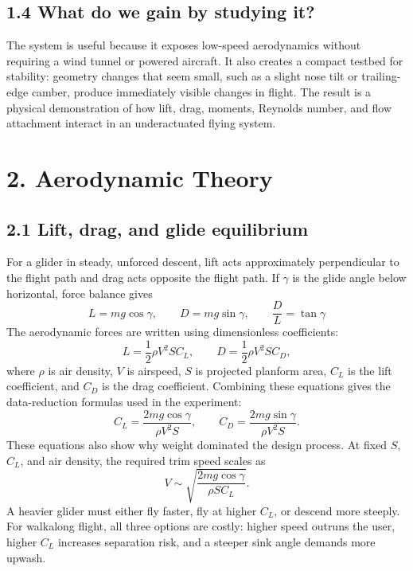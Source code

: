 \documentclass[10pt]{article}
\newcommand{\pagehead}[1]{\section*{#1}\addcontentsline{toc}{section}{#1}}
\begin{document}
\subsection*{1.4 What do we gain by studying it?}
The system is useful because it exposes low-speed aerodynamics without requiring a wind tunnel or powered aircraft. It also creates a compact testbed for stability: geometry changes that seem small, such as a slight nose tilt or trailing-edge camber, produce immediately visible changes in flight. The result is a physical demonstration of how lift, drag, moments, Reynolds number, and flow attachment interact in an underactuated flying system.



\pagehead{2. Aerodynamic Theory}

\subsection*{2.1 Lift, drag, and glide equilibrium}
For a glider in steady, unforced descent, lift acts approximately perpendicular to the flight path and drag acts opposite the flight path. If $\gamma$ is the glide angle below horizontal, force balance gives
\begin{equation}
L = mg\cos\gamma, \qquad D = mg\sin\gamma, \qquad \frac{D}{L}=\tan\gamma
\end{equation}
The aerodynamic forces are written using dimensionless coefficients:
\begin{equation}
L = \frac{1}{2}\rho V^2 S C_L, \qquad D = \frac{1}{2}\rho V^2 S C_D,
\end{equation}
where $\rho$ is air density, $V$ is airspeed, $S$ is projected planform area, $C_L$ is the lift coefficient, and $C_D$ is the drag coefficient. Combining these equations gives the data-reduction formulas used in the experiment:
\begin{equation}
C_L = \frac{2mg\cos\gamma}{\rho V^2 S}, \qquad C_D = \frac{2mg\sin\gamma}{\rho V^2 S}.
\end{equation}
These equations also show why weight dominated the design process. At fixed $S$, $C_L$, and air density, the required trim speed scales as
\begin{equation}
V \sim \sqrt{\frac{2mg\cos\gamma}{\rho S C_L}}.
\end{equation}
A heavier glider must either fly faster, fly at higher $C_L$, or descend more steeply. For walkalong flight, all three options are costly: higher speed outruns the user, higher $C_L$ increases separation risk, and a steeper sink angle demands more upwash.
\end{document}
